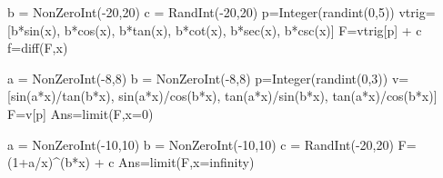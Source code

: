 \begin{sagesilent}
b = NonZeroInt(-20,20)
c = RandInt(-20,20)   
p=Integer(randint(0,5))
vtrig=[b*sin(x), b*cos(x), b*tan(x), b*cot(x), b*sec(x), b*csc(x)]
F=vtrig[p] + c
f=diff(F,x)
\end{sagesilent}


\begin{sagesilent}
a = NonZeroInt(-8,8)
b = NonZeroInt(-8,8)
p=Integer(randint(0,3))
v=[sin(a*x)/tan(b*x), sin(a*x)/cos(b*x), tan(a*x)/sin(b*x), tan(a*x)/cos(b*x)]
F=v[p]
Ans=limit(F,x=0)
\end{sagesilent}


\begin{sagesilent}
a = NonZeroInt(-10,10)
b = NonZeroInt(-10,10)
c = RandInt(-20,20)
F=(1+a/x)^(b*x) + c
Ans=limit(F,x=infinity)
\end{sagesilent}



